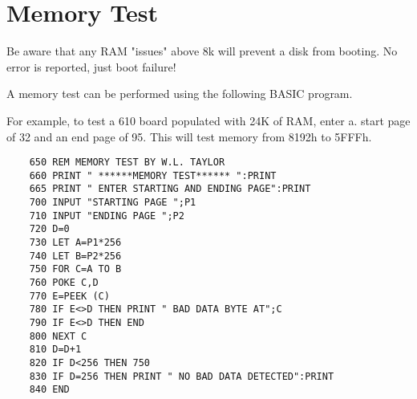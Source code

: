 \section{Memory Test}

Be aware that any RAM "issues" above 8k will prevent a disk from booting. No error is reported, just boot failure!

A memory test can be performed using the following BASIC program.

For example, to test a 610 board populated with 24K of RAM, enter a. start page of 32 and an end page of 95. This will test memory from 8192h to 5FFFh. 

\begin{verbatim}
    650 REM MEMORY TEST BY W.L. TAYLOR
    660 PRINT " ******MEMORY TEST****** ":PRINT
    665 PRINT " ENTER STARTING AND ENDING PAGE":PRINT
    700 INPUT "STARTING PAGE ";P1
    710 INPUT "ENDING PAGE ";P2
    720 D=0
    730 LET A=P1*256
    740 LET B=P2*256
    750 FOR C=A TO B
    760 POKE C,D
    770 E=PEEK (C)
    780 IF E<>D THEN PRINT " BAD DATA BYTE AT";C
    790 IF E<>D THEN END
    800 NEXT C
    810 D=D+1
    820 IF D<256 THEN 750
    830 IF D=256 THEN PRINT " NO BAD DATA DETECTED":PRINT
    840 END
\end{verbatim}
